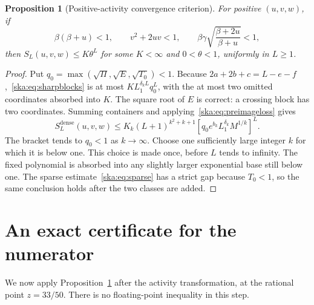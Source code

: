 \documentclass[11pt,letterpaper]{article}
\newtheorem{proposition}[theorem]{Proposition}
\theoremstyle{definition}
\begin{document}
\begin{proposition}[Positive-activity convergence criterion]\label{ska:prop:criterion}
For positive $(u,v,w)$, if
\begin{equation}\label{ska:eq:criterion}
\beta(\beta+u)<1,\qquad v^2+2uv<1,\qquad
\beta\gamma\sqrt{\frac{\beta+2u}{\beta+u}}<1,
\end{equation}
then $S_L(u,v,w)\le K\theta^L$ for some $K<\infty$ and $0<\theta<1$, uniformly in $L\ge1$.
\end{proposition}
\begin{proof}
Put $q_0=\max(\sqrt\Pi,\sqrt E,\sqrt{T_0})<1$. Because $2a+2b+c=L-e-f$,~\eqref{ska:eq:sharpblocks} is at most $K L_1^{\delta_kL}q_0^L$, with the at most two omitted coordinates absorbed into $K$. The square root of $E$ is correct: a crossing block has two coordinates. Summing containers and applying~\eqref{ska:eq:preimageloss} gives
\begin{equation}\label{ska:eq:densecriterion}
S_L^{\mathrm{dense}}(u,v,w)
\le K_k(L+1)^{k^2+k+1}
\left[q_0e^{b_k}L_1^{\delta_k}M^{1/k}\right]^L.
\end{equation}
The bracket tends to $q_0<1$ as $k\to\infty$. Choose one sufficiently large integer $k$ for which it is below one. This choice is made once, before $L$ tends to infinity. The fixed polynomial is absorbed into any slightly larger exponential base still below one. The sparse estimate~\eqref{ska:eq:sparse} has a strict gap because $T_0<1$, so the same conclusion holds after the two classes are added.
\end{proof}

\section{An exact certificate for the numerator}\label{ska:sec:numerator}
We now apply Proposition~\ref{ska:prop:criterion} after the activity transformation, at the rational point $z=33/50$. There is no floating-point inequality in this step.
\end{document}
